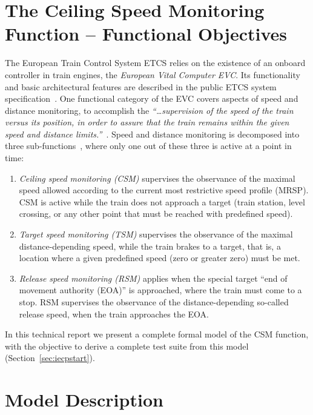 \section{The Ceiling Speed Monitoring Function -- Functional Objectives}
\label{sec:ceil}
 
The
European Train Control System ETCS relies on the existence of an onboard controller
in train engines, the \emph{European Vital Computer EVC}. Its functionality and basic architectural features are described in the public ETCS system specification~\cite{ETCS}. 
One functional category of the EVC covers aspects of speed and distance monitoring, to accomplish the  \emph{``\ldots supervision of the speed of the train versus its position, in order to assure that the train remains within the given speed and distance limits.''}~\cite[3.13.1.1]{ETCSSRS-Principles}. Speed and distance monitoring  is decomposed into three sub-functions~\cite[3.13.10.1.2]{ETCSSRS-Principles}, where only one out of these three is active at a point in time:
\begin{enumerate}
\item \emph{Ceiling speed monitoring (CSM)} supervises the observance of the maximal speed allowed according to the current most restrictive speed profile (MRSP). CSM is active while the train does not approach a target (train station, level crossing, or any other   point that must be reached with predefined speed).

\item \emph{Target speed monitoring (TSM)} supervises the observance of the maximal distance-depending  speed, while the train brakes to a target, that is, a location where a given predefined speed (zero or greater zero) must be met.

\item \emph{Release speed monitoring (RSM)} applies when the special target ``end of movement authority (EOA)'' is approached, where the train must come to a stop. RSM supervises the observance of the distance-depending  so-called release speed, when the train approaches the EOA. 
\end{enumerate}

In this technical report we present a complete formal model of the CSM function, with the objective to derive a complete test suite from this model (Section~\ref{sec:iecpstart}).


\section{Model Description}\label{sec:modeldesc}


